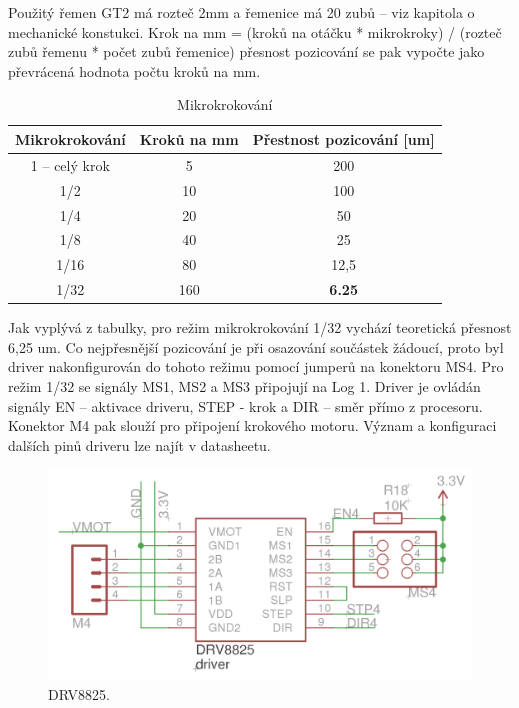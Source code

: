 Použitý řemen GT2 má rozteč 2mm a řemenice má 20 zubů – viz kapitola o mechanické konstukci.
Krok na mm = (kroků na otáčku * mikrokroky) / (rozteč zubů řemenu  * počet zubů řemenice)
přesnost pozicování se pak vypočte jako převrácená hodnota počtu kroků na mm.

\begin{table}[h!]
  \caption{Mikrokrokování }
  \begin{center}
  	\small
	  \begin{tabular}{|c|c|c|}
	    \hline
	    Mikrokrokování		& Kroků na mm 		& Přestnost pozicování [um] 	\\
	    \hline\hline

		1 – celý krok 		& 5			& 200 				\\
		\hline
		1/2			& 10			& 100				\\
		\hline
		1/4			& 20			& 50				\\
		\hline
		1/8			& 40			& 25				\\
		\hline
		1/16			& 80			& 12,5				\\
		\hline
		1/32			& 160			& {\bf 6.25} 			\\
		\hline
	    \hline
	  \end{tabular}
  \end{center}
\end{table}

Jak vyplývá z tabulky, pro režim mikrokrokování 1/32 vychází teoretická přesnost 6,25 um. Co nejpřesnější pozicování je při osazování součástek žádoucí, proto byl driver nakonfigurován do tohoto režimu pomocí jumperů na konektoru MS4. Pro režim  1/32 se signály MS1, MS2 a MS3 připojují na Log 1.   Driver je ovládán signály EN – aktivace driveru, STEP - krok a DIR – směr přímo z procesoru. Konektor M4 pak slouží pro připojení krokového motoru. Význam a konfiguraci dalších pinů driveru lze najít v datasheetu.

\begin{figure}[h!]

  \centering
    \includegraphics[width=0.8\linewidth]{obrazky/motorDriver.png}%
    \caption{DRV8825.}
\end{figure}

